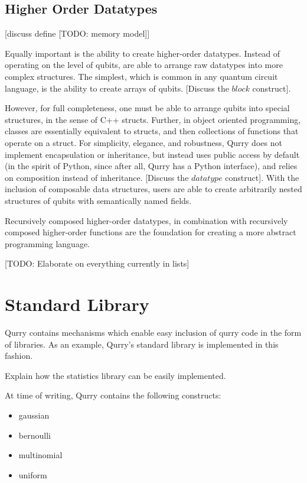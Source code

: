 \documentclass[journal]{article}
\begin{document}
    \subsection{Higher Order Datatypes}

    [discuss define [TODO: memory model]]

    Equally important is the ability to create higher-order datatypes.
    Instead of operating on the level of qubits, are able to arrange raw datatypes into more complex structures.
    The simplest, which is common in any quantum circuit language, is the ability to create arrays of qubits.
    [Discuss the $block$ construct].

    However, for full completeness, one must be able to arrange qubits into special structures, in the sense of C++ structs.
    Further, in object oriented programming, classes are essentially equivalent to structs, and then collections of functions that operate on a struct.
    For simplicity, elegance, and robustness, Qurry does not implement encapsulation or inheritance, but instead uses public access by default (in the spirit of Python, since after all, Qurry has a Python interface), and relies on composition instead of inheritance.
    [Discuss the $datatype$ construct].
    With the inclusion of composable data structures, users are able to create arbitrarily nested structures of qubits with semantically named fields.

    Recursively composed higher-order datatypes, in combination with recursively composed higher-order functions are the foundation for creating a more abstract programming language.

    [TODO: Elaborate on everything currently in lists]

\section{Standard Library}

    Qurry contains mechanisms which enable easy inclusion of qurry code in the form of libraries.
    As an example, Qurry's standard library is implemented in this fashion.

    Explain how the statistics library can be easily implemented.

    At time of writing, Qurry contains the following constructs:  	
    \begin{itemize}
	    \item gaussian 	
        \item bernoulli
	    \item multinomial 	
	    \item uniform
    \end{itemize}
\end{document}
